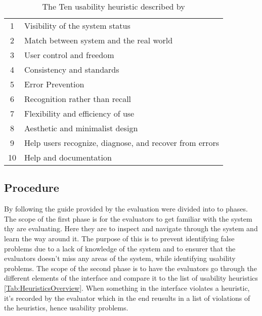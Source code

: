 \begin{table}
	\centering
\begin{tabular}[width=\textwidth]{|c|l|}
1 & Visibility of the system status \\
2 & Match between system and the real world \\
3 & User control and freedom \\
4 & Consistency and standards \\
5 & Error Prevention \\
6 & Recognition rather than recall \\
7 & Flexibility and efficiency of use \\
8 & Aesthetic and minimalist design \\
9 & Help users recognize, diagnose, and recover from errors \\
10 & Help and documentation
\end{tabular}
\caption{The Ten usability heuristic described by \textcite{WEB:Nielsen1994}}
\label{Tab:HeuristicsOverview}
\end{table}

\subsection{Procedure}
\label{HeuristicProcedure}
By following the guide provided by \textcite{WEB:Nielsen1994HowTo} the evaluation were divided into to phases. The scope of the first phase is for the evaluators to get familiar with the system thy are evaluating. Here they are to inspect and navigate through the system and learn the way around it. The purpose of this is to prevent identifying false problems due to a lack of knowledge of the system and to ensurer that the evaluators doesn't miss any areas of the system, while identifying usability problems. The scope of the second phase is to have the evaluators go through the different elements of the interface and compare it to the list of usability heuristics \autoref{Tab:HeuristicsOverview}. When something in the interface violates a heuristic, it's recorded by the evaluator which in the end reusults in a list of violations of the heuristics, hence usability problems. 


